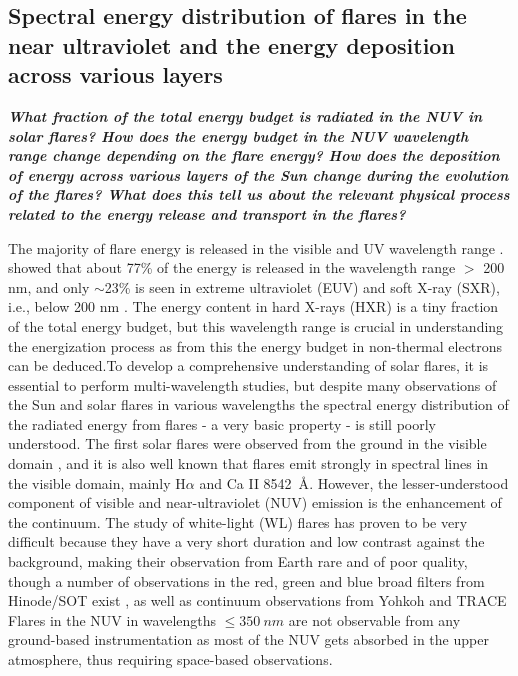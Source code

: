 \documentclass{article}
\begin{document}
\subsection{Spectral energy distribution of flares in the near ultraviolet and the energy deposition across various layers}

\textit{\textbf{What fraction of the total energy budget is radiated in the NUV in solar flares? How does the energy budget in the NUV wavelength range change depending on the flare energy?%
How does the deposition of energy across various layers of the Sun change during the evolution of the flares? What does this tell us about the relevant physical process related to the energy release and transport in the flares?}}

\vspace{0.2in}
 The majority of flare energy is released in the visible and UV wavelength range \citep{woods06}. \cite{woods04} showed that about 77\% of the energy is released in the wavelength range $>$ 200 nm, and only $\sim$23\% is seen in extreme ultraviolet (EUV) and soft X-ray (SXR), i.e., below 200 nm \citep{Nei_1989,neidig93,kretzschmar11}. The energy content in hard X-rays (HXR) is a tiny fraction of the total energy budget, but this wavelength range is crucial in understanding the energization process \citep{holeman11} as from this the energy budget in non-thermal electrons can be deduced.To develop a comprehensive understanding of solar flares, it is essential to perform multi-wavelength studies, but despite many observations of the Sun and solar flares in various wavelengths the spectral energy distribution of the radiated energy from flares - a very basic property - is still poorly understood. The first solar flares were observed from the ground in the visible domain \citep{carrington1859,neidig93}, and it is also well known that flares emit strongly in spectral lines in the visible domain, mainly H$\alpha$ and Ca II 8542~\AA \citep{canfield90,falchi92,heinzel94}. However, the lesser-understood component of visible and near-ultraviolet (NUV) emission is the enhancement of the continuum. The study of white-light (WL) flares has proven to be very difficult because they have a very short duration and low contrast against the background, making their observation from Earth rare and of poor quality, though a number of observations in the red, green and blue broad filters from Hinode/SOT exist \citep[e.g.][]{2017ApJ...850..204W}, as well as continuum observations from Yohkoh \citep{2003A&A...409.1107M} and TRACE \citep{2006SoPh..234...79H}
 Flares in the NUV in wavelengths $\leq 350~nm$ are not observable from any ground-based instrumentation as most of the NUV gets absorbed in the upper atmosphere, thus requiring space-based observations.
\end{document}
